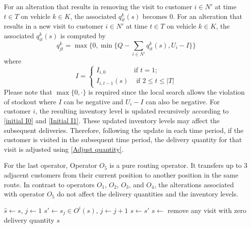 \documentclass{article}
\begin{document}
For an alteration that results in removing the visit to customer $i\in N'$ at time $t\in T$ on vehicle $k\in K$, the associated $q^k_{it}(s)$ becomes 0. For an alteration that results in a new visit to customer $i\in N'$ at time $t\in T$ on vehicle $k\in K$, the associated $q^k_{it}(s)$ is computed by
\begin{equation}
   q^k_{jt} = \max\{0,\min\{Q - \sum_{i\in N'}q^k_{it}(s), U_i-I \}\}\label{Adjust quantity}
\end{equation}
where 
\begin{equation*}    
I= \left\{ \begin{array}{ll}
  		I_{i,0}  & \mbox{if $t =1$}; \\
 		I_{i,t-1}(s) & \mbox{ if $2\leq t\leq |T| $} 
  		\end{array}\right. 
\end{equation*}
Please note that $\max\{0,\cdot\}$ is required since the local search allows the violation of stockout where $I$ can be negative and $U_i-I$ can also be negative. For customer $i$, the resulting inventory level is updated recursively according to \eqref{initial I0} and \eqref{Initial I1}. These updated inventory levels may affect the subsequent deliveries. Therefore, following the update in each time period, if the customer is visited in the subsequent time period, the delivery quantity for that visit is adjusted using \eqref{Adjust quantity}.

For the last operator, Operator $O_5$ is a pure routing operator. It transfers up to 3 adjacent customers from their current position to another position in the same route. In contrast to operators $O_1$, $O_2$, $O_3$, and $O_4$, the alterations associated with operator $O_5$ do not affect the delivery quantities and the inventory levels.

\begin{algorithm}
\captionsetup{labelformat=empty}
\caption{\textbf{Local Search$(s,\alpha)$}} \label{alg:LocalSearch}
\begin{algorithmic}[1]
 \label{search: for}
    \REPEAT \label{search: repeat N}
        \STATE $\hat{s} \gets s$, $j \gets 1$
            \STATE $s' \gets s_j \in O^i(s)$,  $j \gets j+1$
                     \STATE $s \gets s'$
                \ENDIF
        \ENDWHILE
     \label{search: until N}        
\ENDFOR \label{search: endfor}
\STATE $s\gets $ remove any visit with zero delivery quantity
\RETURN $s$
\end{algorithmic}
\end{algorithm}
\end{document}
